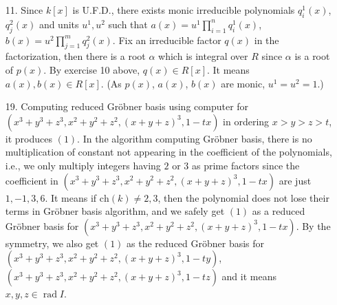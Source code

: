 \documentclass[12pt]{article}
\DeclareMathOperator{\rad}{\mathrm{rad}}
\begin{document}
\begin{enumerate}
\item[11.] Since $k[x]$ is U.F.D., there exists monic irreducible polynomials $q^1_i(x)$, $q^2_j(x)$ and units $u^1,u^2$ such that $a(x)=u^1\prod_{i=1}^n q^1_i(x)$, $b(x)=u^2\prod_{j=1}^m q^2_j(x)$. Fix an irreducible factor $q(x)$ in the factorization, then there is a root $\alpha$ which is integral over $R$ since $\alpha$ is a root of $p(x)$. By exercise 10 above, $q(x)\in R[x]$. It means $a(x),b(x)\in R[x]$. (As $p(x)$, $a(x)$, $b(x)$ are monic, $u^1=u^2=1$.)
\newpage


\item[19.]
Computing reduced Gr\"obner basis using computer for $(x^3+y^3+z^3, x^2+y^2+z^2, (x+y+z)^3, 1-tx)$ in ordering $x>y>z>t$, it produces $(1)$. In the algorithm computing Gr\"obner basis, there is no multiplication of constant not appearing in the coefficient of the polynomials, i.e., we only multiply integers having $2$ or $3$ as prime factors since the coefficient in $(x^3+y^3+z^3, x^2+y^2+z^2, (x+y+z)^3, 1-tx)$ are just $1, -1, 3,6$. It means if $\text{ch}(k)\neq 2,3$, then the polynomial does not lose their terms in Gr\"obner basis algorithm, and we safely get $(1)$ as a reduced Gr\"obner basis for $(x^3+y^3+z^3, x^2+y^2+z^2, (x+y+z)^3, 1-tx)$. By the symmetry, we also get $(1)$ as the reduced Gr\"obner basis for $(x^3+y^3+z^3, x^2+y^2+z^2, (x+y+z)^3, 1-ty)$, $(x^3+y^3+z^3, x^2+y^2+z^2, (x+y+z)^3, 1-tz)$ and it means $x,y,z\in \rad I$.
\newpage



\end{enumerate}
\end{document}

